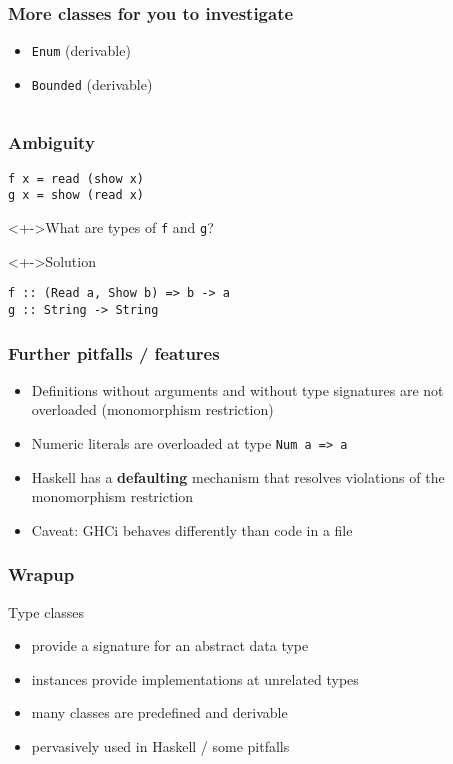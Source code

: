\documentclass{beamer}
\begin{document}
\begin{frame}[fragile]
  \frametitle{More classes for you to investigate}
  \begin{itemize}
  \item \texttt{Enum} (derivable)
  \item \texttt{Bounded} (derivable)
  \end{itemize}
\begin{lstlisting}
\end{lstlisting}
\end{frame}
\begin{frame}[fragile]
  \frametitle{Ambiguity}
\begin{lstlisting}
f x = read (show x)
g x = show (read x)
\end{lstlisting}
\begin{block}<+->{What are types of \texttt{f} and \texttt{g}?}
\end{block}
\begin{block}<+->{Solution}
\begin{lstlisting}
f :: (Read a, Show b) => b -> a
g :: String -> String
\end{lstlisting}
\end{block}
\end{frame}
\begin{frame}[fragile]
  \frametitle{Further pitfalls / features}
  \begin{itemize}
  \item Definitions without arguments and without type signatures are not overloaded (monomorphism restriction)
  \item Numeric literals are overloaded at type \texttt{Num a => a}
  \item Haskell has a \textbf{defaulting} mechanism that resolves violations of the monomorphism restriction 
  \item Caveat: GHCi behaves differently than code in a file
  \end{itemize}
\end{frame}
\begin{frame}
  \frametitle{Wrapup}
  \begin{alertblock}{Type classes}
  \begin{itemize}
  \item provide a signature for an abstract data type
  \item instances provide implementations at unrelated types
  \item many classes are predefined and derivable
  \item pervasively used in Haskell / some pitfalls
  \end{itemize}
  \end{alertblock}
\end{frame}

\end{document}

